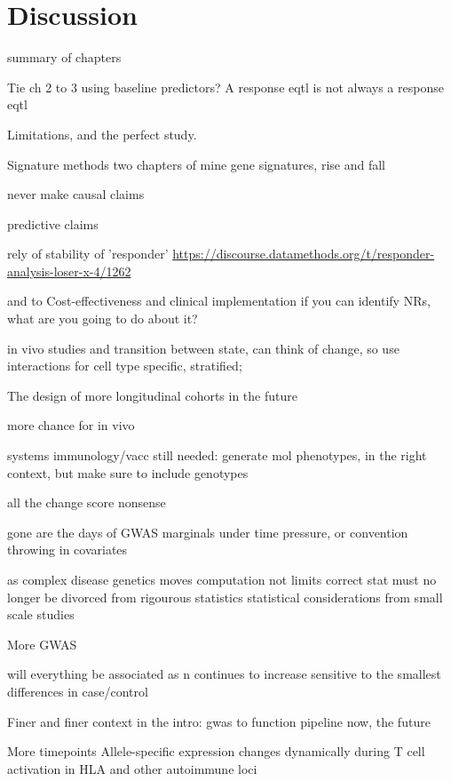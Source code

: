 %
%

\chapter{Discussion}

\begin{outline}

summary of chapters

    Tie ch 2 to 3 using baseline predictors?
    A response eqtl is not always a response eqtl

    Limitations, and the perfect study.

Signature methods 
    two chapters of mine
    gene signatures, rise and fall

    never make causal claims

    predictive claims

        rely of stability of 'responder'
            \url{https://discourse.datamethods.org/t/responder-analysis-loser-x-4/1262}

    and to Cost-effectiveness and clinical implementation
        if you can identify NRs, what are you going to do about it?

in vivo studies and transition between state, can think of change, so use interactions
for cell type specific, stratified;


The design of more longitudinal cohorts in the future

    more chance for in vivo

    systems immunology/vacc still needed: generate mol phenotypes, in the right context,
    but make sure to include genotypes

    all the change score nonsense

    gone are the days of GWAS marginals
        under time pressure, or convention
        throwing in covariates

    as     complex disease genetics moves 
    computation not limits correct stat
    must no longer be divorced from rigourous statistics
        statistical considerations from small scale studies

More GWAS


    will everything be associated as n continues to increase
    sensitive to the smallest differences in case/control


Finer and finer context
    in the intro: gwas to function pipeline
    now, the future

    More timepoints
    Allele-specific expression changes dynamically during T cell activation in HLA and other autoimmune loci


\end{outline}
